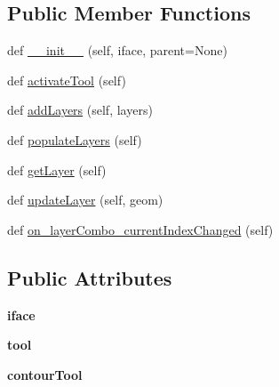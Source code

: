 \subsection*{Public Member Functions}
\begin{DoxyCompactItemize}
\item 
def \mbox{\hyperlink{class_dsg_tools_1_1_production_tools_1_1_contour_tool_1_1calc__contour_1_1_calc_contour_ad02230ead576a46cc073c7dbd8d727ca}{\+\_\+\+\_\+init\+\_\+\+\_\+}} (self, iface, parent=None)
\item 
def \mbox{\hyperlink{class_dsg_tools_1_1_production_tools_1_1_contour_tool_1_1calc__contour_1_1_calc_contour_a77277fe69185751b2a7f864444d2228a}{activate\+Tool}} (self)
\item 
def \mbox{\hyperlink{class_dsg_tools_1_1_production_tools_1_1_contour_tool_1_1calc__contour_1_1_calc_contour_ab51fb1608dce6909d4bf61e78f9e4eaf}{add\+Layers}} (self, layers)
\item 
def \mbox{\hyperlink{class_dsg_tools_1_1_production_tools_1_1_contour_tool_1_1calc__contour_1_1_calc_contour_ad7e4f68d2e9a1cd8e06d46c46fa83e04}{populate\+Layers}} (self)
\item 
def \mbox{\hyperlink{class_dsg_tools_1_1_production_tools_1_1_contour_tool_1_1calc__contour_1_1_calc_contour_a729fae5b49ceff8bf835c26ac2eae84e}{get\+Layer}} (self)
\item 
def \mbox{\hyperlink{class_dsg_tools_1_1_production_tools_1_1_contour_tool_1_1calc__contour_1_1_calc_contour_a909c2b0fc4a807a06532ddfbc44c8199}{update\+Layer}} (self, geom)
\item 
def \mbox{\hyperlink{class_dsg_tools_1_1_production_tools_1_1_contour_tool_1_1calc__contour_1_1_calc_contour_a1b46a4a7adf5ded9c11171b947f249ba}{on\+\_\+layer\+Combo\+\_\+current\+Index\+Changed}} (self)
\end{DoxyCompactItemize}
\subsection*{Public Attributes}
\begin{DoxyCompactItemize}
\item 
\mbox{\label{class_dsg_tools_1_1_production_tools_1_1_contour_tool_1_1calc__contour_1_1_calc_contour_a1fd7c8b61dfdd05a9dbed162df6fad7d}} 
{\bfseries iface}
\item 
\mbox{\label{class_dsg_tools_1_1_production_tools_1_1_contour_tool_1_1calc__contour_1_1_calc_contour_a18da6e58620d2a858e0a6db6e33e45ee}} 
{\bfseries tool}
\item 
\mbox{\label{class_dsg_tools_1_1_production_tools_1_1_contour_tool_1_1calc__contour_1_1_calc_contour_aff8b5f8830d302f00040f1fbdada89a7}} 
{\bfseries contour\+Tool}
\end{DoxyCompactItemize}
